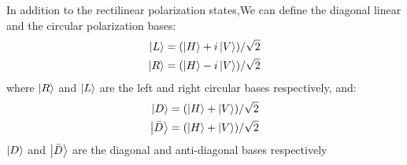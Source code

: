 In addition to the rectilinear polarization states,We can define the diagonal linear and
the circular polarization bases: 
\begin{equation}
	\begin{split}
		\ket{L}=(\ket{H}+i\ket{V})/\sqrt{2} \\
		\ket{R}=(\ket{H}-i\ket{V})/\sqrt{2}
	\end{split}
\end{equation}
where $\ket{R}$ and $\ket{L}$ are the left and right circular bases respectively, and:
\begin{equation}
	\begin{split}
		\ket{D}=(\ket{H}+\ket{V})/\sqrt{2}\\
		\ket{\bar{D}}=(\ket{H}+\ket{V})/\sqrt{2}
	\end{split}
\end{equation}
$\ket{D}$ and $\ket{\bar{D}}$ are the diagonal and anti-diagonal bases respectively

